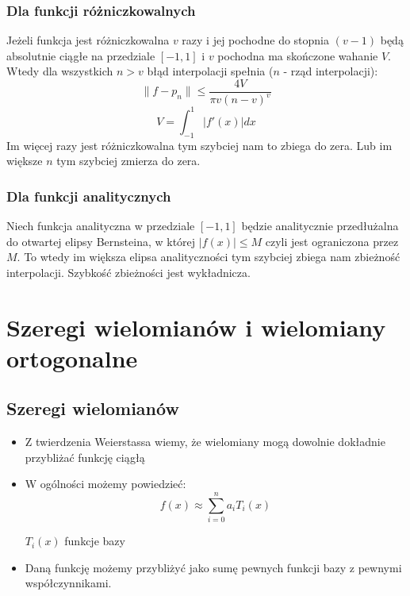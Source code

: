 \documentclass[a4paper]{article}
\begin{document}
\subsubsection{Dla funkcji różniczkowalnych}
Jeżeli funkcja jest różniczkowalna $v$ razy i jej pochodne do stopnia $(v-1)$ będą absolutnie ciągłe na przedziale $[-1, 1]$ i $v$ pochodna ma skończone wahanie $V$. Wtedy dla wszystkich $n > v$ błąd interpolacji spełnia ($n$ - rząd interpolacji):
\begin{equation*}
    \|f-p_n \| \leq \frac{4V}{\pi v (n-v)^v}
\end{equation*}
\begin{equation*}
    V = \int_{-1}^1{|f'(x)|}dx
\end{equation*}
Im więcej razy jest różniczkowalna tym szybciej nam to zbiega do zera. Lub im większe $n$ tym szybciej zmierza do zera.

\subsubsection{Dla funkcji analitycznych}
Niech funkcja analityczna w przedziale $[-1, 1]$ będzie analitycznie przedłużalna do otwartej elipsy Bernsteina, w której $|f(x)| \leq M$ czyli jest ograniczona przez $M$. To wtedy im większa elipsa analityczności tym szybciej zbiega nam zbieżność interpolacji. Szybkość zbieżności jest wykładnicza.

\section{Szeregi wielomianów i wielomiany ortogonalne}

\subsection{Szeregi wielomianów}

\begin{itemize}
    \item Z twierdzenia Weierstassa wiemy, że wielomiany mogą dowolnie dokładnie przybliżać funkcję ciągłą
    \item W ogólności możemy powiedzieć:
    \begin{equation*}
        f\left(x\right)\approx\sum_{i=0}^{n}{a_iT_i\left(x\right)}
    \end{equation*}
    \item[$T_i(x)$] funkcje bazy
    \item Daną funkcję możemy przybliżyć jako sumę pewnych funkcji bazy z pewnymi współczynnikami.
\end{itemize}
\end{document}
